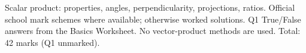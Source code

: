 \def\housemode{sol}
\def\diquestionsonly{1}

\def\risoltitle{H2 Math Vectors I Homework 2: Solutions}

\risolfront
{\small\textcolor{black!60}{Scalar product: properties, angles, perpendicularity, projections, ratios. Official school mark schemes where available; otherwise worked solutions. Q1 True/False answers from the Basics Worksheet. No vector-product methods are used. Total: 42 marks (Q1 unmarked).}}\par\medskip
{}%
\diend

